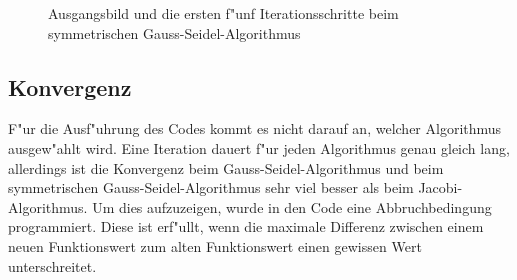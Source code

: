 \begin{refsection}
\begin{figure}
\centering 
{}\quad 
{}\quad 
{} 
\centering 
{}\quad 
{}\quad 
{} 
\caption{Ausgangsbild und die ersten f"unf Iterationsschritte beim
symmetrischen Gauss-Seidel-Algorithmus} 
\end{figure}

\subsection{Konvergenz}
F"ur die Ausf"uhrung des Codes kommt es nicht darauf an, welcher
Algorithmus ausgew"ahlt wird. Eine Iteration dauert f"ur jeden
Algorithmus genau gleich lang, allerdings ist die Konvergenz beim
Gauss-Seidel-Algorithmus und beim symmetrischen Gauss-Seidel-Algorithmus
sehr viel besser als beim Jacobi-Algorithmus. Um dies aufzuzeigen,
wurde in den Code eine Abbruchbedingung programmiert. Diese ist erf"ullt,
wenn die maximale Differenz zwischen einem neuen Funktionswert zum alten
Funktionswert einen gewissen Wert unterschreitet.


\end{refsection}

